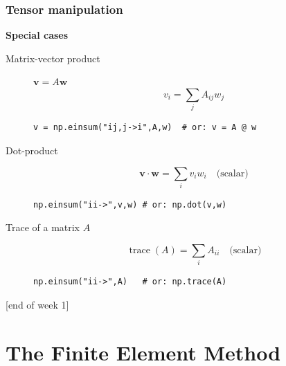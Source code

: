 \documentclass{beamer}
\begin{document}

\begin{frame}[fragile]
  \frametitle{Tensor manipulation}
  \textbf{Special cases}
  \begin{description}
   \item[Matrix-vector product] $\boldsymbol{v}=A\boldsymbol{w}$
$$
v_i = \sum_j A_{ij}w_j
$$
\begin{lstlisting}
v = np.einsum("ij,j->i",A,w)  # or: v = A @ w
\end{lstlisting}
  \item[Dot-product]
$$
\boldsymbol{v}\cdot \boldsymbol{w} = \sum_i v_i w_i \quad\text{(scalar)}
$$
\begin{lstlisting}
np.einsum("ii->",v,w) # or: np.dot(v,w)  
\end{lstlisting}
\item[Trace of a matrix $A$]
$$
\operatorname{trace}(A) = \sum_{i} A_{ii}\quad\text{(scalar)}
$$
\begin{lstlisting}
np.einsum("ii->",A)   # or: np.trace(A)
\end{lstlisting}
\end{description}
{\begin{flushright} {\footnotesize [end of week 1]} \end{flushright}}
\end{frame}

\section{The Finite Element Method}

\begin{frame}
  \tableofcontents[currentsection]
\end{frame}

\end{document}
